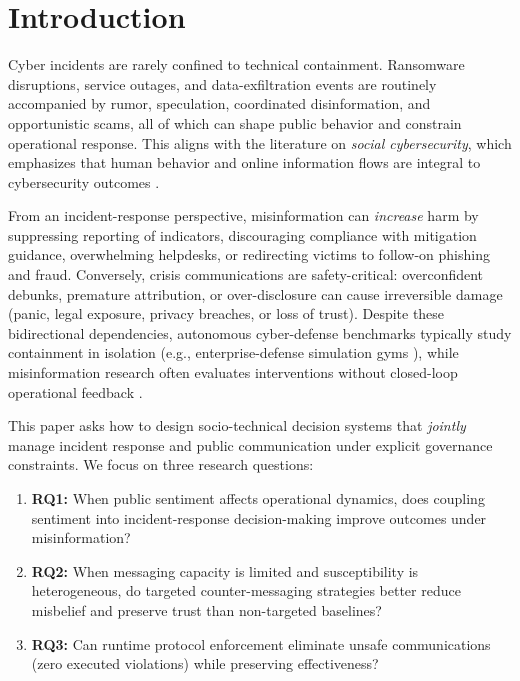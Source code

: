 \documentclass[biomimetics,article,submit,pdftex,moreauthors]{Definitions/mdpi}
\begin{document}
\section{Introduction}
Cyber incidents are rarely confined to technical containment. Ransomware disruptions, service outages, and data-exfiltration events are routinely accompanied by rumor, speculation, coordinated disinformation, and opportunistic scams, all of which can shape public behavior and constrain operational response. This aligns with the literature on \emph{social cybersecurity}, which emphasizes that human behavior and online information flows are integral to cybersecurity outcomes \citep{carley2020social,mulahuwaish2025survey}.

From an incident-response perspective, misinformation can \emph{increase} harm by suppressing reporting of indicators, discouraging compliance with mitigation guidance, overwhelming helpdesks, or redirecting victims to follow-on phishing and fraud. Conversely, crisis communications are safety-critical: overconfident debunks, premature attribution, or over-disclosure can cause irreversible damage (panic, legal exposure, privacy breaches, or loss of trust). Despite these bidirectional dependencies, autonomous cyber-defense benchmarks typically study containment in isolation (e.g., enterprise-defense simulation gyms \citep{baillie2020cyborg,kunz2023multiagent}), while misinformation research often evaluates interventions without closed-loop operational feedback \citep{lazer2018science,vosoughi2018spread,kozyreva2024toolbox,lewandowsky2021inoculation,ng2021platform}.

This paper asks how to design socio-technical decision systems that \emph{jointly} manage incident response and public communication under explicit governance constraints. We focus on three research questions:
\begin{enumerate}[leftmargin=*]
  \item \textbf{RQ1:} When public sentiment affects operational dynamics, does coupling sentiment into incident-response decision-making improve outcomes under misinformation?
  \item \textbf{RQ2:} When messaging capacity is limited and susceptibility is heterogeneous, do targeted counter-messaging strategies better reduce misbelief and preserve trust than non-targeted baselines?
  \item \textbf{RQ3:} Can runtime protocol enforcement eliminate unsafe communications (zero executed violations) while preserving effectiveness?
\end{enumerate}
\end{document}
